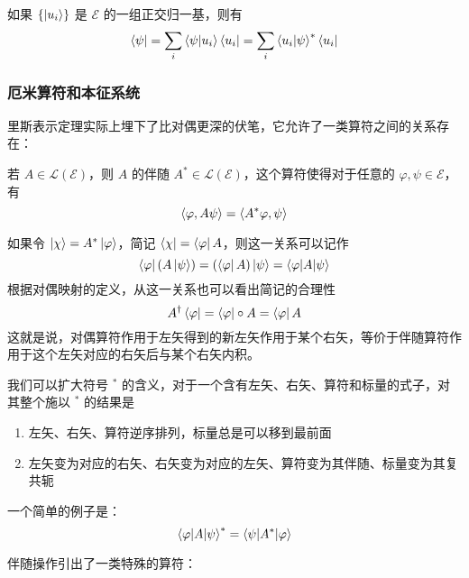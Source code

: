 \documentclass[cn,10pt,math=newtx,citestyle=gb7714-2015,bibstyle=gb7714-2015]{elegantbook}
\def\ms{\mathscr}
\def\mc{\mathcal}
\def\vphi{\varphi}
\def\dg{\dagger}
\begin{document}
\begin{corollary}[左矢的分量]\label{cor:bracomponent}
如果 $\{\ket{u_i}\}$ 是 $\ms E$ 的一组正交归一基，则有
\begin{equation*}
    \bra{\psi}=\sum_i\braket{\psi|u_i}\bra{u_i}=\sum_i\braket{u_i|\psi}^*\bra{u_i}
\end{equation*}
\end{corollary}

\subsubsection{厄米算符和本征系统}

里斯表示定理实际上埋下了比对偶更深的伏笔，它允许了一类算符之间的关系存在：
\begin{definition}[算符的伴随]\label{def:adjoint}
若 $A\in\mc L(\ms E)$，则 $A$ 的伴随 $A^*\in\mc L(\ms E)$，这个算符使得对于任意的 $\vphi,\psi\in\ms E$，有
\begin{equation*}
  \Braket{\vphi,A\psi}=\Braket{A^*\vphi,\psi}
\end{equation*}
\end{definition}
如果令 $\ket{\chi} = A^*\ket{\vphi}$，简记 $\bra{\chi} = \bra{\vphi}A$，则这一关系可以记作
\begin{equation}
    \bra{\vphi}(A\ket{\psi})=(\bra{\vphi}A)\ket{\psi}=\braket{\vphi|A|\psi}
\end{equation}
根据对偶映射的定义，从这一关系也可以看出简记的合理性
\begin{equation}
    A^\dg\bra{\vphi}=\bra{\vphi}\circ A=\bra{\vphi}A
\end{equation}
这就是说，对偶算符作用于左矢得到的新左矢作用于某个右矢，等价于伴随算符作用于这个左矢对应的右矢后与某个右矢内积。

\begin{remark}
我们可以扩大符号 $^*$ 的含义，对于一个含有左矢、右矢、算符和标量的式子，对其整个施以 $^*$ 的结果是
\begin{enumerate}
    \item 左矢、右矢、算符逆序排列，标量总是可以移到最前面
    \item 左矢变为对应的右矢、右矢变为对应的左矢、算符变为其伴随、标量变为其复共轭
\end{enumerate}
一个简单的例子是：
\begin{equation}
    \braket{\vphi|A|\psi}^*=\braket{\psi|A^*|\vphi}
\end{equation}
\end{remark}

伴随操作引出了一类特殊的算符：
\end{document}
